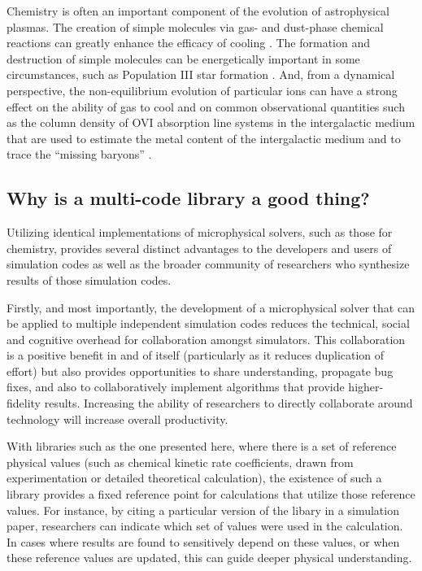 Chemistry is often an important component of the evolution of
astrophysical plasmas.  The creation of simple molecules via gas- and
dust-phase chemical reactions can greatly enhance the efficacy of
cooling \citep{1979ApJS...41..555H, 2005ApJ...626..627O}.  The formation
and destruction of simple molecules can be energetically important in
some circumstances, such as Population III star formation
\citep{1998ApJ...508..141O, 2002Sci...295...93A, 2008MNRAS.388.1627G,
2009Sci...325..601T}.
And, from a dynamical perspective, the non-equilibrium evolution of
particular ions can have a strong effect on the ability of gas to cool
\citep{1997NewA....2..181A, 1997NewA....2..209A} and on common
observational quantities such as the column density of OVI absorption
line systems in the intergalactic medium that are used to estimate the
metal content of the intergalactic medium and to trace the ``missing
baryons'' \citep{2006ApJ...650..573C, 2011ApJ...731....6S,
2013MNRAS.434.1043O, 2014ApJ...796...49S}.

\subsection{Why is a multi-code library a good thing?}

Utilizing identical implementations of microphysical solvers, such as
those for chemistry, provides several distinct advantages to the
developers and users of simulation codes as well as the broader
community of researchers who synthesize results of those simulation
codes.

Firstly, and most importantly, the development of a microphysical solver that
can be applied to multiple independent simulation codes reduces the technical,
social and cognitive overhead for collaboration amongst simulators.
This collaboration is a positive benefit in and of itself (particularly as it
reduces duplication of effort) but also provides opportunities to share
understanding, propagate bug fixes, and also to collaboratively implement 
algorithms that provide higher-fidelity results.  Increasing the ability of
researchers to directly collaborate around technology will increase overall
productivity.

With libraries such as the one presented here, where there is a set of
reference
physical values (such as chemical kinetic rate coefficients, drawn from
experimentation or detailed theoretical calculation), the existence of such a
library provides a fixed reference point for calculations that utilize those
reference values.  For instance, by citing a particular version of
the libary in a simulation paper, researchers can indicate which set of
values were used in the calculation.  In cases where results are found to
sensitively depend on these values, or when these reference values are updated,
this can guide deeper physical understanding.


